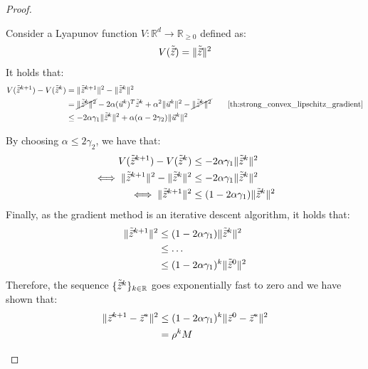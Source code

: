 \begin{theorem}
\begin{proof}
\begin{enumerate}
                Consider a Lyapunov function $V: \mathbb{R}^d \rightarrow \mathbb{R}_{\geq 0}$ defined as:
                \[
                    V(\tilde{{\vec{z}}}) = \Vert \tilde{{\vec{z}}} \Vert^2
                \]
                It holds that:
                \[
                    \begin{aligned}
                        V(\tilde{\z}^{k+1}) - V(\tilde{\z}^k) &= \Vert \tilde{\z}^{k+1} \Vert^2 - \Vert \tilde{\z}^k \Vert^2 \\
                        &= \cancel{\Vert \tilde{\z}^k \Vert^2} - 2\alpha(\vec{u}^k)^T\tilde{\z}^k + \alpha^2 \Vert \vec{u}^k \Vert^2 - \cancel{\Vert \tilde{\z}^k \Vert^2} &&& \text{\Cref{th:strong_convex_lipschitz_gradient}} \\
                        &\leq -2\alpha\gamma_1 \Vert\tilde{\z}^k\Vert^2 + \alpha(\alpha-2\gamma_2) \Vert\vec{u}^k\Vert^2
                    \end{aligned}
                \]

                By choosing $\alpha \leq 2\gamma_2$, we have that:
                \[
                    \begin{split}
                        V(\tilde{{\vec{z}}}^{k+1}) - V(\tilde{{\vec{z}}}^k) &\leq -2\alpha\gamma_1 \Vert \tilde{{\vec{z}}}^k \Vert^2 \\
                        \iff \Vert \tilde{{\vec{z}}}^{k+1} \Vert^2 - \Vert \tilde{{\vec{z}}}^k \Vert^2 &\leq -2\alpha\gamma_1 \Vert \tilde{{\vec{z}}}^k \Vert^2 \\
                        \iff \Vert \tilde{{\vec{z}}}^{k+1} \Vert^2 &\leq (1-2\alpha\gamma_1) \Vert \tilde{{\vec{z}}}^k \Vert^2 \\
                    \end{split}
                \]
                Finally, as the gradient method is an iterative descent algorithm, it holds that:
                \[
                    \begin{split}
                        \Vert \tilde{{\vec{z}}}^{k+1} \Vert^2 &\leq (1-2\alpha\gamma_1) \Vert \tilde{{\vec{z}}}^k \Vert^2 \\
                        &\leq \dots \\
                        &\leq (1-2\alpha\gamma_1)^k \Vert \tilde{{\vec{z}}}^0 \Vert^2 \\
                    \end{split}
                \]
                Therefore, the sequence $\{ \tilde{{\vec{z}}}^k \}_{k \in \mathbb{R}}$ goes exponentially fast to zero and we have shown that:
                \[
                    \begin{split}
                        \Vert {\vec{z}}^{k+1} - {\vec{z}}^* \Vert^2 &\leq (1-2\alpha\gamma_1)^k \Vert {\vec{z}}^0 - {\vec{z}}^* \Vert^2 \\
                        &= \rho^k M
                    \end{split}
                \]
        \end{enumerate}
    \end{proof}
\end{theorem}

